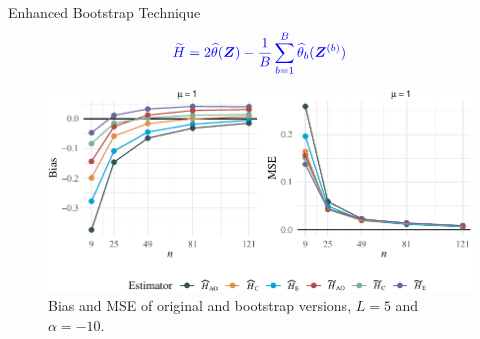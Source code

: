 \documentclass[aspectratio=169,10pt]{beamer}
\begin{document}
\begin{frame}
\begin{columns}[T,onlytextwidth]
  \pause  
\begin{column}{.48\textwidth}\vspace{-0.1cm}
\begin{exampleblock}{Enhanced Bootstrap Technique}
        \begin{align*}
\textcolor[rgb]{0,0,1}{\widetilde{H} = 2\widehat{\theta}(\bm{Z}) - \frac{1}{B}\sum_{b=1}^B \widehat{\theta}_b(\bm{Z}^{(b)})}
\end{align*} 
      \end{exampleblock}
					     \begin{block}{} \vspace{-0.8cm}
		\justifying
				\begin{figure}[H] 
         \centering
         \includegraphics[scale=0.51]{./Figures/Plot_bias_mse_gi0-1} 
        \caption*{\tiny{Bias and MSE of original and bootstrap versions, $L=5$ and  $\alpha=-10$.}}
    \end{figure}
\end{block}\vspace{2.8cm}
    \end{column}
\end{columns}\vspace{0.2cm}
       

\end{frame} 

\end{document}
